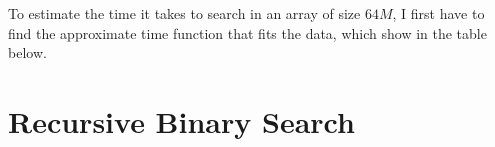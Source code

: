 \documentclass[a4paper,11pt]{article}
\begin{document}
To estimate the time it takes to search in an array of size $64M$, I first have to
find the approximate time function that fits the data, which show in the table below.

  


\section*{Recursive Binary Search}
\end{document}
